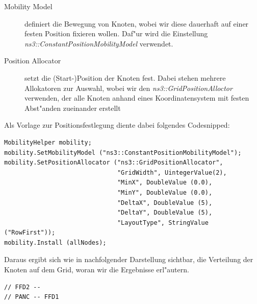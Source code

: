 \begin{description}
  \item[Mobility Model] definiert die Bewegung von Knoten, wobei wir diese
  dauerhaft auf einer festen Position fixieren wollen. Daf"ur wird die Einstellung
  \textit{ns3::ConstantPositionMobilityModel} verwendet.
  \item [Position Allocator] setzt die (Start-)Position der Knoten fest. Dabei
  stehen mehrere Allokatoren zur Auswahl, wobei wir den \textit{ns3::GridPositionAlloctor}
  verwenden, der alle Knoten anhand eines Koordinatensystem mit festen Abst"anden
  zueinander erstellt
\end{description}

Als Vorlage zur Positionsfestlegung diente dabei folgendes Codesnipped:

\begin{lstlisting}[frame=single]
MobilityHelper mobility;
mobility.SetMobilityModel ("ns3::ConstantPositionMobilityModel");
mobility.SetPositionAllocator ("ns3::GridPositionAllocator",
                               "GridWidth", UintegerValue(2),
                               "MinX", DoubleValue (0.0),
                               "MinY", DoubleValue (0.0),
                               "DeltaX", DoubleValue (5),
                               "DeltaY", DoubleValue (5),
                               "LayoutType", StringValue ("RowFirst"));
mobility.Install (allNodes);
\end{lstlisting}

Daraus ergibt sich wie in nachfolgender Darstellung sichtbar, die Verteilung
der Knoten auf dem Grid, woran wir die Ergebnisse erl"autern.

\begin{lstlisting}[frame=single]
// FFD2 --
// PANC -- FFD1
\end{lstlisting}

